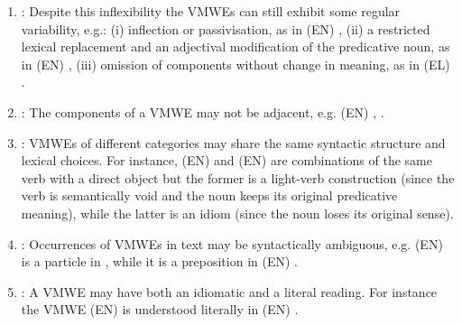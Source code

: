 \documentclass[output=paper,
modfonts,
]{langscibook}
\begin{document}
\begin{enumerate}

\item\label{prop:variability} :  Despite this inflexibility the VMWEs can still exhibit some regular variability, e.g.: (i) inflection or passivisation, as in (EN) , (ii) a restricted lexical replacement and an  adjectival modification of the predicative noun, as in (EN) , (iii) omission of components without change in meaning, as in (EL) %
.
\item\label{prop:nonadj} : The components of a VMWE may not be adjacent, e.g. (EN) , . 
\item\label{prop:categ} : VMWEs of different categories may share the same syntactic structure and lexical choices. For instance,  (EN)  and (EN)  are combinations of the same verb with a direct object but the former is a light-verb construction (since the verb is semantically void and the noun keeps its original predicative meaning), while  the latter is an idiom (since the noun loses its original sense). 
\item\label{prop:synt-amb}:  Occurrences of VMWEs in text may be syntactically ambiguous, e.g. (EN)  is a particle in , while it is a preposition in (EN) . 
\item\label{prop:readings} : A VMWE may have both an idiomatic and a literal reading. For instance the VMWE (EN)  is understood literally in (EN) . 

\end{enumerate}
\end{document}
